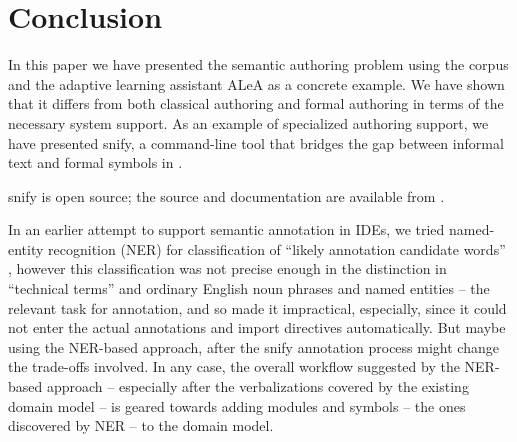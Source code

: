 \documentclass{llncs}
\newcommand\ALeA{\textsf{ALeA}\xspace}
\newcommand\snify{\textsf{snify}\xspace}
\begin{document}
\section{Conclusion}\label{sec:conclusion}

In this paper we have presented the semantic authoring problem using the \sTeX corpus and
the adaptive learning assistant \ALeA as a concrete example. We have shown that it differs
from both classical authoring and formal authoring in terms of the necessary system
support. As an example of specialized authoring support, we have presented \snify, a
command-line tool that bridges the gap between informal text and formal symbols in \sTeX.

\snify is open source; the source and documentation are available from
\cite{stextools:git}.

In an earlier attempt to support semantic annotation in IDEs, we tried named-entity
recognition (NER) for classification of ``likely annotation candidate words''
\cite{hutterer:msc23}, however this classification was not precise enough in the
distinction in ``technical terms'' and ordinary English noun phrases and named entities --
the relevant task for annotation, and so made it impractical, especially, since it could
not enter the actual annotations and import directives automatically. But maybe using the
NER-based approach, after the \snify annotation process might change the trade-offs
involved. In any case, the overall workflow suggested by the NER-based approach --
especially after the verbalizations covered by the existing domain model -- is geared towards adding modules and symbols -- the ones discovered by NER
-- to the domain model. 

\printbibliography
\end{document}
